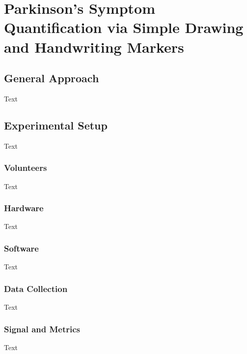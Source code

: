 \chapter{Parkinson's Symptom Quantification via Simple Drawing and Handwriting Markers}
\label{ch:handwriting}
\pagestyle{fancy}
\fancyhf{}
\fancyhead[OC]{\leftmark}
\fancyhead[EC]{\rightmark}
\cfoot{\thepage}

\section{General Approach}
\label{sec:genApproach}
Text
\section{Experimental Setup}
\label{sec:expSetup}
Text
\subsection{Volunteers}
\label{sebsec:volunteers}
Text
\subsection{Hardware}
\label{sebsec:hardware}
Text
\subsection{Software}
\label{sebsec:software}
Text
\subsection{Data Collection}
\label{subsec:dataCollection}
Text
\subsection{Signal and Metrics}
\label{subsec:signalMetrics}
Text

